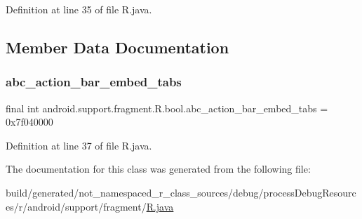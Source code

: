 Definition at line 35 of file R.\+java.


\begin{DoxyCode}{0}

\end{DoxyCode}


\subsection{Member Data Documentation}
\mbox{\label{classandroid_1_1support_1_1fragment_1_1_r_1_1bool_aade12b7432258093b82bae701731c7f7}} 
\subsubsection{\texorpdfstring{abc\_action\_bar\_embed\_tabs}{abc\_action\_bar\_embed\_tabs}}
{\footnotesize\ttfamily final int android.\+support.\+fragment.\+R.\+bool.\+abc\+\_\+action\+\_\+bar\+\_\+embed\+\_\+tabs = 0x7f040000\hspace{0.3cm}{\ttfamily [static]}}



Definition at line 37 of file R.\+java.



The documentation for this class was generated from the following file\+:\begin{DoxyCompactItemize}
\item 
build/generated/not\+\_\+namespaced\+\_\+r\+\_\+class\+\_\+sources/debug/process\+Debug\+Resources/r/android/support/fragment/\mbox{\hyperlink{android_2support_2fragment_2_r_8java}{R.\+java}}\end{DoxyCompactItemize}
